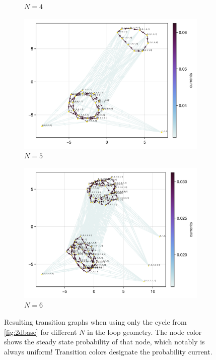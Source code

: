 \documentclass[11pt]{article}
\theoremstyle{nothm}
\begin{document}
\begin{tcolorbox}
\begin{figure}[H]
\begin{subfigure}[t]{0.49\textwidth}
            \caption{$N=4$}
        \end{subfigure}
        \begin{subfigure}[t]{0.49\textwidth}
            \centering
            \includegraphics[width=\textwidth]{../../plots/ones/c1/spring_N=5_metadata=(chash=5795298381321907906,ctype=simple).png}
            \caption{$N=5$}
        \end{subfigure}
        \begin{subfigure}[t]{0.49\textwidth}
            \centering
            \includegraphics[width=\textwidth]{../../plots/ones/c1/spring_N=6_metadata=(chash=5795298381321907906,ctype=simple).png}
            \caption{$N=6$}
        \end{subfigure}
        \caption{
            Resulting transition graphs when using only the cycle from \cref{fig:2dbase} for different $N$ in the loop geometry.
            The node color shows the steady state probability of that node, which notably is always uniform!
            Transition colors designate the probability current.
        }\label{fig:2dbase_graphs}
    \end{figure}
\end{tcolorbox}
\end{document}
